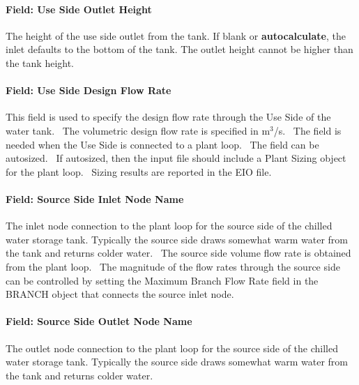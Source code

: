 \paragraph{Field: Use Side Outlet Height}\label{field-use-side-outlet-height-thermalstoragehotwaterstratified}

The height of the use side outlet from the tank. If blank or
\textbf{autocalculate}, the inlet defaults to the bottom of the tank. The outlet
height cannot be higher than the tank height.

\paragraph{Field: Use Side Design Flow
Rate}\label{field-use-side-design-flow-rate-thermalstoragehotwaterstratified}

This field is used to specify the design flow rate through the Use Side of the
water tank.~ The volumetric design flow rate is specified in m\(^{3}\)/s.~ The
field is needed when the Use Side is connected to a plant loop.~ The field can
be autosized.~ If autosized, then the input file should include a Plant Sizing
object for the plant loop.~ Sizing results are reported in the EIO file.

\paragraph{Field: Source Side Inlet Node
Name}\label{field-source-side-inlet-node-name-thermalstoragehotwaterstratified}

The inlet node connection to the plant loop for the source side of the chilled
water storage tank. Typically the source side draws somewhat warm water from the
tank and returns colder water.~ The source side volume flow rate is obtained
from the plant loop.~ The magnitude of the flow rates through the source side
can be controlled by setting the Maximum Branch Flow Rate field in the BRANCH
object that connects the source inlet node.

\paragraph{Field: Source Side Outlet Node
Name}\label{field-source-side-outlet-node-name-thermalstoragehotwaterstratified}

The outlet node connection to the plant loop for the source side of the chilled
water storage tank. Typically the source side draws somewhat warm water from the
tank and returns colder water.

